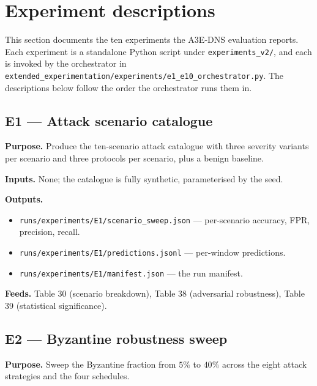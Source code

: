 %

\section{Experiment descriptions}

This section documents the ten experiments the A3E-DNS evaluation
reports. Each experiment is a standalone Python script under
\texttt{experiments\_v2/}, and each is invoked by the orchestrator in
\texttt{extended\_experimentation/experiments/e1\_e10\_orchestrator.py}.
The descriptions below follow the order the orchestrator runs them in.

\subsection{E1 --- Attack scenario catalogue}

\textbf{Purpose.} Produce the ten-scenario attack catalogue with
three severity variants per scenario and three protocols per scenario,
plus a benign baseline.

\textbf{Inputs.} None; the catalogue is fully synthetic, parameterised
by the seed.

\textbf{Outputs.}
\begin{itemize}
\item \texttt{runs/experiments/E1/scenario\_sweep.json} — per-scenario
      accuracy, FPR, precision, recall.
\item \texttt{runs/experiments/E1/predictions.jsonl} — per-window
      predictions.
\item \texttt{runs/experiments/E1/manifest.json} — the run manifest.
\end{itemize}

\textbf{Feeds.} Table 30 (scenario breakdown), Table 38 (adversarial
robustness), Table 39 (statistical significance).

\subsection{E2 --- Byzantine robustness sweep}

\textbf{Purpose.} Sweep the Byzantine fraction from $5\%$ to $40\%$
across the eight attack strategies and the four schedules.

